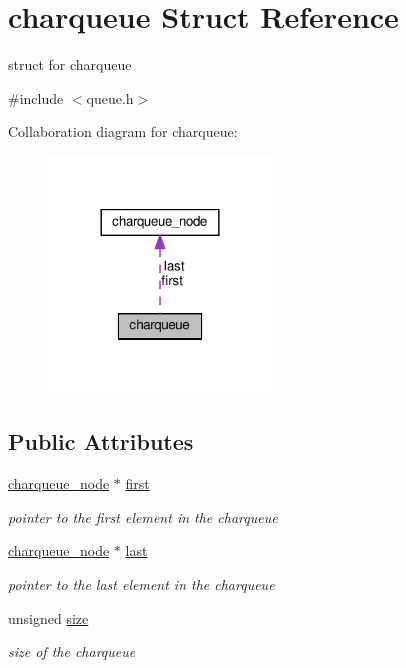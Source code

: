 \hypertarget{structcharqueue}{}\section{charqueue Struct Reference}
\label{structcharqueue}


struct for charqueue  




{\ttfamily \#include $<$queue.\+h$>$}



Collaboration diagram for charqueue\+:\nopagebreak
\begin{figure}[H]
\begin{center}
\leavevmode
\includegraphics[width=168pt]{structcharqueue__coll__graph}
\end{center}
\end{figure}
\subsection*{Public Attributes}
\begin{DoxyCompactItemize}
\item 
\hyperlink{structcharqueue__node}{charqueue\+\_\+node} $\ast$ \hyperlink{structcharqueue_abb7dc7337962f3271ebf4de73def3d50}{first}
\begin{DoxyCompactList}\small\item\em pointer to the first element in the charqueue \end{DoxyCompactList}\item 
\hyperlink{structcharqueue__node}{charqueue\+\_\+node} $\ast$ \hyperlink{structcharqueue_aa3de86477958821f7b9eb00fd0a49da6}{last}
\begin{DoxyCompactList}\small\item\em pointer to the last element in the charqueue \end{DoxyCompactList}\item 
unsigned \hyperlink{structcharqueue_ac922520c1a6c8a25cc334530cd53c00c}{size}
\begin{DoxyCompactList}\small\item\em size of the charqueue \end{DoxyCompactList}\end{DoxyCompactItemize}


